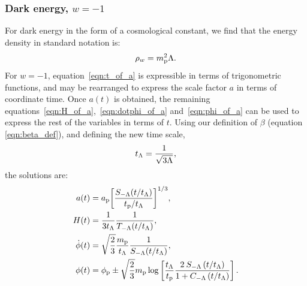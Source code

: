 \subsubsection{Dark energy, \(w=-1\)}
For dark energy in the form of a cosmological constant, we find that the energy density in standard notation is:
%
\begin{equation}
  \rho_w = m_{\mathrm{p}}^2\Lambda.
\end{equation}
%
For \(w=-1\), equation~\eqref{eqn:t_of_a} is expressible in terms of trigonometric functions, and may be rearranged to express the scale factor \(a\) in terms of coordinate time. Once \(a(t)\) is obtained, the remaining equations~\eqref{eqn:H_of_a},~\eqref{eqn:dotphi_of_a} and~\eqref{eqn:phi_of_a} can be used to express the rest of the variables in terms of \(t\). Using our definition of \(\beta\) (equation \nolinebreak\ref{eqn:beta_def}), and defining the new time scale,
%
\begin{equation}
  t_\mathrm{\Lambda} = \frac{1}{\sqrt{3\Lambda}},
  \label{eqn:tl}
\end{equation}
%
the solutions are:
%
\begin{align}
  a(t)
  &=
  a_{\mathrm{p}}{\left[{\frac {S_{-\Lambda}(t/t_\mathrm{\Lambda})}{t_{\mathrm{p}}/t_\mathrm{\Lambda}}}\right]}^{1/3},
  \\
  H(t)
  &=
  \frac{1}{3t_\mathrm{\Lambda}}\frac{1}{T_{-\Lambda}(t/t_\mathrm{\Lambda})},
  \\
  \dot{\phi}(t)
  &=
  \sqrt{\frac{2}{3}}\frac{m_{\mathrm{p}}}{t_\mathrm{\Lambda}}\frac{1}{S_{-\Lambda}(t/t_\mathrm{\Lambda})},
  \\
  \phi(t)
  &=
  \phi_{\mathrm{p}} \pm \sqrt{\frac{2}{3}}m_{\mathrm{p}}
  \log\left[
  \frac{t_\mathrm{\Lambda}}{t_{\mathrm{p}}} 
  \frac 
  {2\: S_{-\Lambda} \left( t/t_\mathrm{\Lambda} \right) }
  {1 + C_{-\Lambda} \left( t/t_\mathrm{\Lambda} \right)}  
  \right].
\end{align}
%


